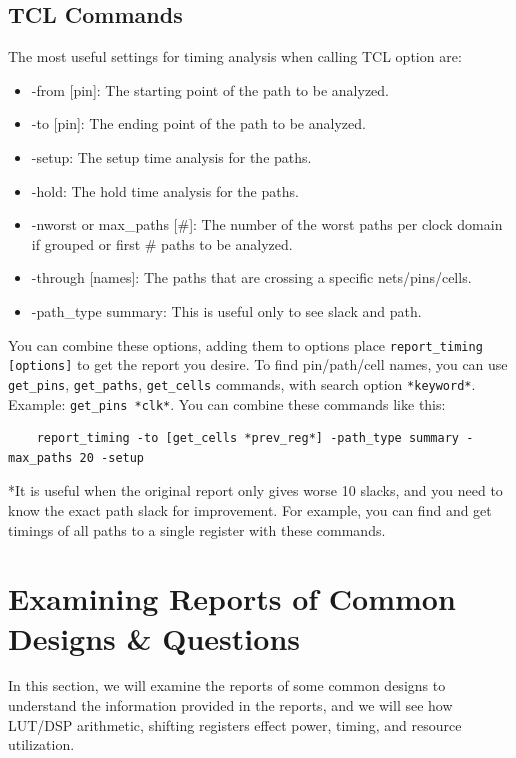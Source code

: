 \documentclass{report}
\begin{document}
\section{TCL Commands}
The most useful settings for timing analysis when calling TCL option are:
\begin{itemize} 
    \item -from [pin]: The starting point of the path to be analyzed.
    \item -to [pin]: The ending point of the path to be analyzed.
    \item -setup: The setup time analysis for the paths.
    \item -hold: The hold time analysis for the paths.
    \item -nworst or max\_paths [\#]: The number of the worst paths per clock domain if grouped or first \# paths to be analyzed.
    \item -through [names]: The paths that are crossing a specific nets/pins/cells.
    \item -path\_type summary: This is useful only to see slack and path.
\end{itemize}

You can combine these options, adding them to options place \texttt{report\_timing [options]} to get the report you desire. 
To find pin/path/cell names, you can use \texttt{get\_pins}, \texttt{get\_paths}, \texttt{get\_cells} commands, with search option \texttt{*keyword*}. Example: \texttt{get\_pins *clk*}.
You can combine these commands like this:
\begin{verbatim}
    report_timing -to [get_cells *prev_reg*] -path_type summary -max_paths 20 -setup
\end{verbatim}
*It is useful when the original report only gives worse 10 slacks, and you need to know the exact path slack for improvement. For example, you can find and get timings of all paths to a single register with these commands.

\chapter{Examining Reports of Common Designs \& Questions}
In this section, we will examine the reports of some common designs to understand the information provided in the reports, and we will see how LUT/DSP arithmetic, shifting registers effect power, timing, and resource utilization.

\end{document}
